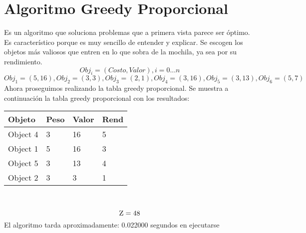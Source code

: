 \documentclass[10pt,letterpaper]{article}
\begin{document}
\section{Algoritmo Greedy Proporcional} 
        Es un algoritmo que soluciona problemas que a primera vista parece ser 
        óptimo. Es característico porque es muy sencillo de entender y explicar. 
        Se escogen los objetos más valiosos que entren en lo que sobra de la mochila, ya sea por su rendimiento. 
        \[ Obj_{i} = (Costo, Valor), i = 0...n \]
\[ Obj_{1} = (5, 16), Obj_{2} = (3, 3), Obj_{3} = (2, 1), Obj_{4} = (3, 16), Obj_{5} = (3, 13), Obj_{6} = (5, 7) \]
\newline Ahora proseguimos realizando la tabla greedy proporcional.
Se muestra a continuación la tabla greedy proporcional con los resultados: 
\begin{center}
\begin{tabu} to 0.6\textwidth { | X[l] | X[l] | X[l] | X[l] |} 
\hline
{}
\textbf{Objeto} & \textbf{Peso} & \textbf{Valor} & \textbf{Rend}\\
\hline
Object 4 & 3 & 16 & 5 \\
\hline
Object 1 & 5 & 16 & 3 \\
\hline
Object 5 & 3 & 13 & 4 \\
\hline
Object 2 & 3 & 3 & 1 \\
\hline
\end{tabu} \\
\end{center}
\[ \textsc{\normalsize Z}\\[0.5cm] = 48 \] 
\newline El algoritmo tarda aproximadamente: 0.022000 segundos en ejecutarse
\end{document}
